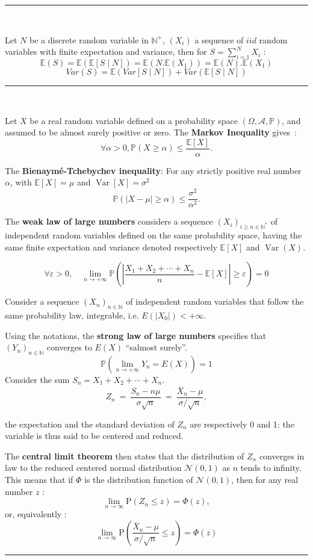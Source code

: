 \hrule
\begin{f}
	{\ }
	
	Let \(N\) be a discrete random variable in \(\mathbb{N}^+\), \(\left(X_i\right)\) a sequence of \(iid\) random variables with finite expectation and variance, then for \(\displaystyle S=\sum_{i=1}^{N}X_i\) :
	\[
	\mathbb{E}(S) = \mathbb{E} (\mathbb{E} [S \mid N]) = \mathbb{E} (N.\mathbb{E}(X_1)) = \mathbb{E}(N).\mathbb{E}(X_1)
	\]
	\[
	Var (S) = \mathbb{E} (Var [S \mid N]) + Var (\mathbb{E} [S \mid N])
	\]
\end{f}

\hrule
\begin{f} {\ }
	
	Let \(X\) be a real random variable defined on a probability space \(\left(\Omega,\mathcal A,\mathbb P\right)\), and assumed to be almost surely positive or zero. The \textbf{Markov Inequality} gives~:
	\[
	\forall \alpha >0, \mathbb P(X\geq \alpha)\leqslant\frac{\mathbb{E}[X]}{\alpha}.
	\]
	
	The \textbf{Bienaymé-Tchebychev inequality}: 
	For any strictly positive real number \(\alpha\), with \(\mathbb{E}[X]=\mu\) and \(\operatorname{Var}[X]=\sigma^2\)
	\[
	\mathbb{P}\left(\left|X-\mu\right| \geq \alpha \right) \leq \frac{\sigma^2}{\alpha^2}.
	\]
	
	The \textbf{weak law of large numbers} considers a sequence \((X_i)_{i\geq n\in\mathbb{N}^*}\) of independent random variables defined on the same probability space, having the same finite expectation and variance denoted respectively \(\mathbb{E}[X]\) and \(\operatorname{Var}(X)\).
	
	\[
	\forall\varepsilon>0,\quad \lim_{n \to +\infty} \mathbb{P}\left(\left|\frac{X_1+X_2+\cdots+X_n}{n} - \mathbb{E}[X]\right| \geq \varepsilon\right) = 0
	\]
	
	Consider a sequence \((X_n)_{n\in \mathbb{N}}\) of independent random variables that follow the same probability law, integrable, i.e. \(E(|X_0|)<+\infty\).
	
	Using the notations, the \textbf{strong law of large numbers} specifies that \((Y_n)_{n\in\mathbb{N}}\) converges to \(E(X)\) \enquote{salmost surely}.
	\[
	\mathbb{P}\left(\lim_{n \to +\infty} Y_n = E(X)\right)=1
	\]
	Consider the sum \(S_n = X_1 + X_2 + \cdots + X_n\).
	\[   
	Z_n\ =\ \frac{S_n - n \mu}{\sigma \sqrt{n}}\ =\ \frac{\overline{X}_n-\mu}{\sigma/\sqrt{n}},
	\]
	
	the expectation and the standard deviation of \(Z_n\) are respectively 0 and 1: the variable is thus said to be centered and reduced.
	
	The \textbf{central limit theorem} then states that the distribution of \(Z_n\) converges in law to the reduced centered normal distribution \(\mathcal{N} (0 , 1)\) as \(n\) tends to infinity. This means that if \(\Phi\) is the distribution function of \(\mathcal{N} (0 , 1)\), then for any real number \(z\) :
	\[
	\lim_{n \to \infty} \mbox{P}(Z_n \le z) = \Phi(z),
	\]
	or, equivalently :
	\[
	\lim_{n\to\infty}\mbox{P}\left(\frac{\overline{X}_n-\mu}{\sigma/\sqrt{n}}\leq z\right)=\Phi(z)
	\]
\end{f}
\hrule

